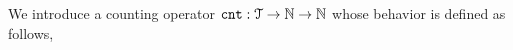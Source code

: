 We introduce a counting operator $\mathtt{cnt} : \mathcal{T} \to \mathbb{N} \to \mathbb{N}$ whose behavior is defined as follows,
